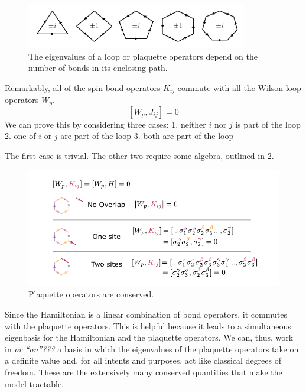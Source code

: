 \begin{figure}
\hypertarget{fig:regular_plaquettes}{%
\centering
\includegraphics[width=0.86\textwidth,height=\textheight]{figure_code/amk_chapter/intro/regular_plaquettes/regular_plaquettes}
\caption[Plaquettes in the Kitaev Model]{The eigenvalues of a loop or plaquette operators depend on the
number of bonds in its enclosing path.}\label{fig:regular_plaquettes}
}
\end{figure}

Remarkably, all of the spin bond operators \(K_{ij}\) commute with all the Wilson loop operators \(W_p\). \[[W_p, J_{ij}] = 0\] We can prove this by considering three cases: 1. neither \(i\) nor \(j\) is part of the loop 2. one of \(i\) or \(j\) are part of the loop 3. both are part of the loop

The first case is trivial. The other two require some algebra, outlined in \cref{fig:visual_kitaev_2}.

\begin{figure}
\hypertarget{fig:visual_kitaev_2}{%
\centering
\includegraphics[width=1\textwidth,height=\textheight]{figure_code/amk_chapter/visual_kitaev_2}
\caption[Plaquette Operators are Conserved]{Plaquette operators are conserved.}\label{fig:visual_kitaev_2}
}
\end{figure}

Since the Hamiltonian is a linear combination of bond operators, it commutes with the plaquette operators. This is helpful because it leads to a simultaneous eigenbasis for the Hamiltonian and the plaquette operators. We can, thus, work in \emph{or ``on''???} a basis in which the eigenvalues of the plaquette operators take on a definite value and, for all intents and purposes, act like classical degrees of freedom. These are the extensively many conserved quantities that make the model tractable.

